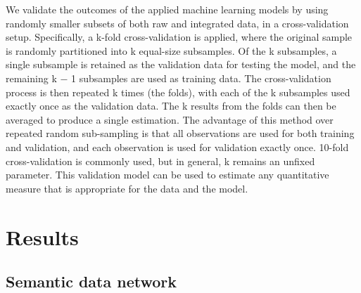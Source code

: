 \documentclass{bmcart}
\begin{document}
We validate the outcomes of the applied machine learning models by using
randomly smaller subsets of both raw and integrated data, in a
cross-validation setup. Specifically, a k{}-fold cross-validation is
applied, where the original sample is randomly partitioned into k
equal-size subsamples. Of the k subsamples, a single subsample is
retained as the validation data for testing the model, and the
remaining k $-$ 1 subsamples are used as training data. The
cross-validation process is then repeated k times (the folds), with
each of the k subsamples used exactly once as the validation data. The
k results from the folds can then be averaged to produce a single
estimation. The advantage of this method over repeated random
sub-sampling is that all observations are used for both training and
validation, and each observation is used for validation exactly once.
10-fold cross-validation is commonly used, but in general, k remains an
unfixed parameter. This validation model can be used to estimate any
quantitative measure that is appropriate for the data and the model. 

\section{Results}

\subsection{Semantic data network}
\end{document}
